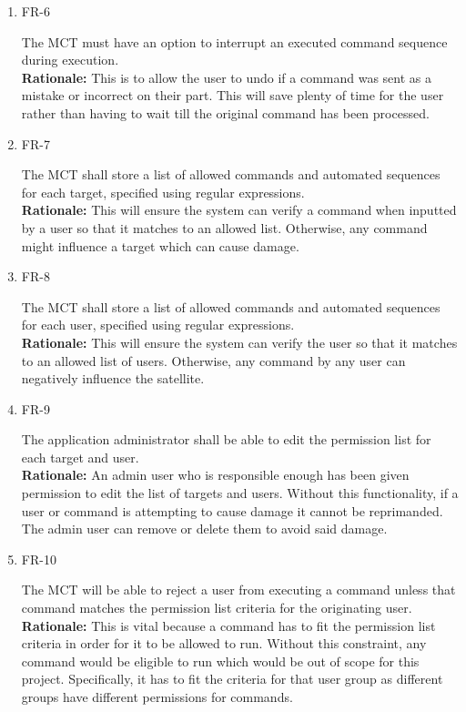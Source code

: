\documentclass[12pt]{article}
\begin{document}
\begin{enumerate}
    \item{FR-6\\}
        
    The MCT must have an option to interrupt an executed command sequence during execution. \\
    \textbf{Rationale:} This is to allow the user to undo if a command was sent as a mistake or incorrect on their part. This will save plenty of time for the user rather than having to wait till the original command has been processed. 

    \item{FR-7\\}
    
    The MCT shall store a list of allowed commands and automated sequences for each target, specified using regular expressions. \\
    \textbf{Rationale:} This will ensure the system can verify a command when inputted by a user so that it matches to an allowed list. Otherwise, any command might influence a target which can cause damage.

    \item{FR-8\\}
        
    The MCT shall store a list of allowed commands and automated sequences for each user, specified using regular expressions. \\
    \textbf{Rationale:} This will ensure the system can verify the user so that it matches to an allowed list of users. Otherwise, any command by any user can negatively influence the satellite. 

    \item{FR-9\\}
    
    The application administrator shall be able to edit the permission list for each target and user. \\
    \textbf{Rationale:} An admin user who is responsible enough has been given permission to edit the list of targets and users. Without this functionality, if a user or command is attempting to cause damage it cannot be reprimanded. The admin user can remove or delete them to avoid said damage. 

    \item{FR-10\\}
    
    The MCT will be able to reject a user from executing a command unless that command matches the permission list criteria for the originating user. \\
    \textbf{Rationale:} This is vital because a command has to fit the permission list criteria in order for it to be allowed to run. Without this constraint, any command would be eligible to run which would be out of scope for this project. Specifically, it has to fit the criteria for that user group as different groups have different permissions for commands. 


\end{enumerate}
\end{document}
